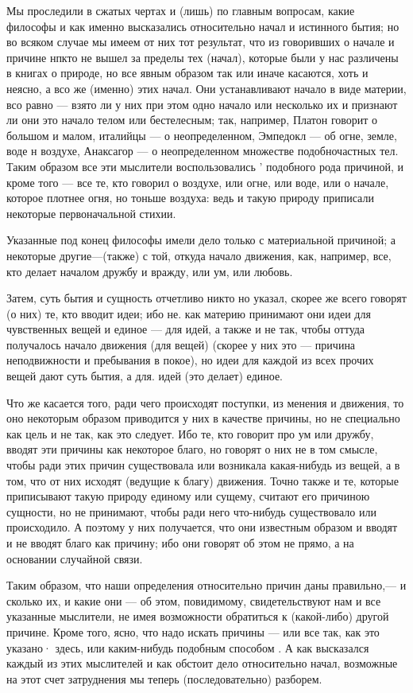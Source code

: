 \documentclass{article}
\begin{document}
Мы проследили в сжатых чертах и (лишь) по главным вопросам, какие философы и как именно высказались относительно начал и истинного бытия; но во всяком случае мы имеем от них тот результат, что из говоривших о начале и причине нпкто не вышел за пределы тех (начал), которые были у нас различены в книгах о природе,
\footnotemark[1]
но все явным образом так или иначе касаются, хоть и неясно, а всо же (именно) этих начал. Они устанавливают начало в виде материи, всо равно — взято ли у них при этом одно начало или несколько их и признают ли они это начало телом или бестелесным; так, например, Платон говорит о большом и малом, италийцы — о неопределенном, Эмпедокл — об огне, земле, воде н воздухе, Анаксагор — о неопределенном множестве подобночастных тел. Таким образом все эти мыслители воспользовались ' подобного рода причиной, и кроме того — все те, кто говорил о воздухе, или огне, или воде, или о начале, которое плотнее огня, но тоньше воздуха:
\footnotemark[2]
ведь и такую природу приписали некоторые первоначальной стихии.

Указанные под конец философы имели дело только с материальной причиной; а некоторые другие—(также) с той, откуда начало движения, как, например, все, кто делает началом дружбу и вражду, или ум, или любовь.

Затем, суть бытия и сущность отчетливо никто но указал, скорее же всего говорят (о них) те, кто вводит идеи; ибо не. как материю принимают они идеи для чувственных вещей и единое — для идей, а также и не так, чтобы оттуда получалось начало движения (для вещей) (скорее у них это — причина неподвижности и пребывания в покое), но идеи для каждой из всех прочих вещей дают суть бытия, а для. идей (это делает) единое.

Что же касается того, ради чего происходят поступки, из менения и движения, то оно некоторым образом приводится у них в качестве причины, но не специально как цель и не так, как это следует. Ибо те, кто говорит про ум или дружбу, вводят эти причины как некоторое благо, но говорят о них не в том смысле, чтобы ради этих причин существовала или возникала какая-нибудь из вещей, а в том, что от них исходят (ведущие к благу) движения. Точно также и те, которые приписывают такую природу единому или сущему,
\footnotemark[4]
считают его причиною сущности, но не принимают, чтобы ради него что-нибудь существовало или происходило. А поэтому у них получается, что они
\footnotemark[5]
известным образом и вводят и не вводят благо как причину; ибо они говорят об этом не прямо, а на основании случайной связи.

Таким образом, что наши определения относительно причин даны правильно,— и сколько их, и какие они — об этом, повидимому, свидетельствуют нам и все указанные мыслители, не имея возможности обратиться к (какой-либо) другой причине. Кроме того, ясно, что надо искать причины — или все так, как это указано· здесь, или каким-нибудь подобным способом . А как высказался каждый из этих мыслителей и как обстоит дело относительно начал, возможные на этот счет затруднения мы теперь (последовательно) разборем.
\end{document}
